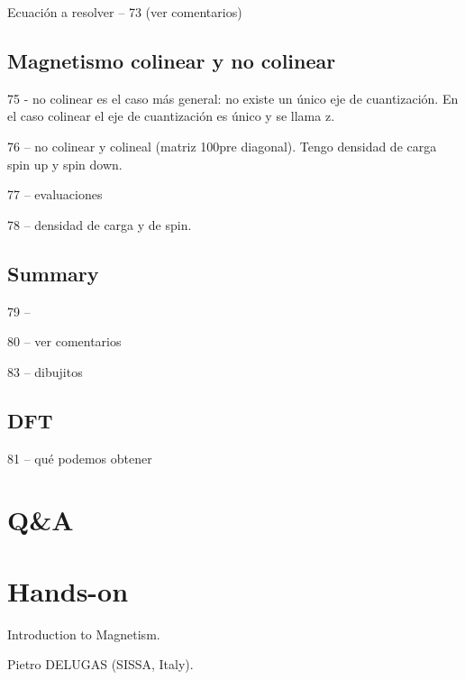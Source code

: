   Ecuación a resolver -- 73 (ver comentarios)

\subsection{Magnetismo colinear y no colinear}

  75 - no colinear es el caso más general: no existe un único eje de cuantización. En el caso colinear el eje de cuantización es único y se llama z.

  76 -- no colinear y colineal (matriz 100pre diagonal). Tengo densidad de carga spin up y spin down.

  77 -- evaluaciones

  78 -- densidad de carga y de spin.

\subsection{Summary}

  79 --

  80 -- ver comentarios

  83 -- dibujitos

\subsection{DFT}

  81 -- qué podemos obtener

\section{Q\&A}

\section{Hands-on}

   Introduction to Magnetism.

  	Pietro DELUGAS (SISSA, Italy).
